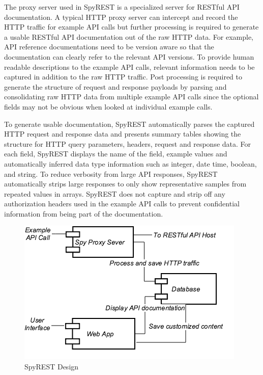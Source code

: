 The proxy server used in SpyREST is a specialized server for RESTful API documentation. A typical HTTP proxy server can intercept and record the HTTP traffic for example API calls but further processing is required to generate a usable RESTful API documentation out of the raw HTTP data. For example, API reference documentations need to be version aware so that the documentation can clearly refer to the relevant API versions. To provide human readable descriptions to the example API calls, relevant information needs to be captured in addition to the raw HTTP traffic. Post processing is required to generate the structure of request and response payloads by parsing and consolidating raw HTTP data from multiple example API calls since the optional fields may not be obvious when looked at individual example calls.

To generate usable documentation, SpyREST automatically parses the captured HTTP request and response data and presents summary tables showing the structure for HTTP query parameters, headers, request and response data. For each field, SpyREST displays the name of the field, example values and automatically inferred data type information such as integer, date time, boolean, and string. To reduce verbosity from large API responses, SpyREST automatically strips large responses to only show representative samples from repeated values in arrays. SpyREST does not capture and strip off any authorization headers used in the example API calls to prevent confidential information from being part of the documentation.

\begin{figure}[tbh]
  \centering
  \includegraphics[width=\linewidth]{spyrest_components.png}
  \caption{SpyREST Design}
  \label{fig:components}
\end{figure}

